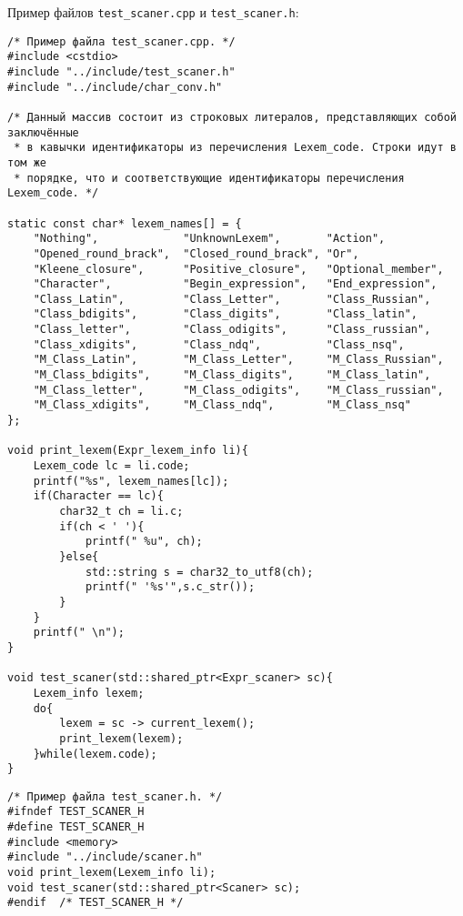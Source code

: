 \documentclass[10pt]{report}
\newcounter{defin}[section]
\begin{document}
Пример файлов \texttt{test_scaner.cpp} и \texttt{test_scaner.h}:
\begin{verbatim}
/* Пример файла test_scaner.cpp. */
#include <cstdio>
#include "../include/test_scaner.h"
#include "../include/char_conv.h"

/* Данный массив состоит из строковых литералов, представляющих собой заключённые
 * в кавычки идентификаторы из перечисления Lexem_code. Строки идут в том же
 * порядке, что и соответствующие идентификаторы перечисления Lexem_code. */

static const char* lexem_names[] = {
    "Nothing",             "UnknownLexem",       "Action",
    "Opened_round_brack",  "Closed_round_brack", "Or",
    "Kleene_closure",      "Positive_closure",   "Optional_member",
    "Character",           "Begin_expression",   "End_expression",
    "Class_Latin",         "Class_Letter",       "Class_Russian",
    "Class_bdigits",       "Class_digits",       "Class_latin",
    "Class_letter",        "Class_odigits",      "Class_russian",
    "Class_xdigits",       "Class_ndq",          "Class_nsq",
    "M_Class_Latin",       "M_Class_Letter",     "M_Class_Russian",
    "M_Class_bdigits",     "M_Class_digits",     "M_Class_latin",
    "M_Class_letter",      "M_Class_odigits",    "M_Class_russian",
    "M_Class_xdigits",     "M_Class_ndq",        "M_Class_nsq"
};

void print_lexem(Expr_lexem_info li){
    Lexem_code lc = li.code;
    printf("%s", lexem_names[lc]);
    if(Character == lc){
        char32_t ch = li.c;
        if(ch < ' '){
            printf(" %u", ch);
        }else{
            std::string s = char32_to_utf8(ch);
            printf(" '%s'",s.c_str());
        }         
    }
    printf(" \n");
}

void test_scaner(std::shared_ptr<Expr_scaner> sc){
    Lexem_info lexem;
    do{
        lexem = sc -> current_lexem();
        print_lexem(lexem);
    }while(lexem.code);
}
\end{verbatim}
\begin{verbatim}
/* Пример файла test_scaner.h. */
#ifndef TEST_SCANER_H
#define	TEST_SCANER_H
#include <memory>
#include "../include/scaner.h"
void print_lexem(Lexem_info li);
void test_scaner(std::shared_ptr<Scaner> sc);
#endif	/* TEST_SCANER_H */
\end{verbatim}
\end{document}
